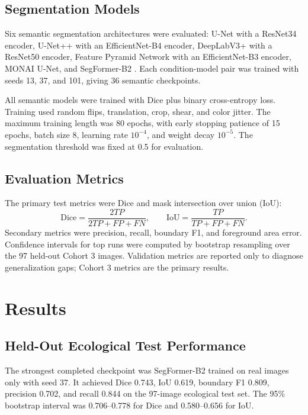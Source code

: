 \documentclass[11pt]{article}
\begin{document}
\subsection{Segmentation Models}

Six semantic segmentation architectures were evaluated: U-Net with a ResNet34 encoder, U-Net++ with an EfficientNet-B4 encoder, DeepLabV3+ with a ResNet50 encoder, Feature Pyramid Network with an EfficientNet-B3 encoder, MONAI U-Net, and SegFormer-B2 \cite{ronneberger2015,zhou2018,chen2018,lin2017,xie2021}. Each condition-model pair was trained with seeds 13, 37, and 101, giving 36 semantic checkpoints.

All semantic models were trained with Dice plus binary cross-entropy loss. Training used random flips, translation, crop, shear, and color jitter. The maximum training length was 80 epochs, with early stopping patience of 15 epochs, batch size 8, learning rate \(10^{-4}\), and weight decay \(10^{-5}\). The segmentation threshold was fixed at 0.5 for evaluation.

\subsection{Evaluation Metrics}

The primary test metrics were Dice and mask intersection over union (IoU):
\begin{equation}
\mathrm{Dice} = \frac{2TP}{2TP + FP + FN}, \qquad
\mathrm{IoU} = \frac{TP}{TP + FP + FN}.
\end{equation}
Secondary metrics were precision, recall, boundary F1, and foreground area error. Confidence intervals for top runs were computed by bootstrap resampling over the 97 held-out Cohort 3 images. Validation metrics are reported only to diagnose generalization gaps; Cohort 3 metrics are the primary results.

\section{Results}

\subsection{Held-Out Ecological Test Performance}

The strongest completed checkpoint was SegFormer-B2 trained on real images only with seed 37. It achieved Dice 0.743, IoU 0.619, boundary F1 0.809, precision 0.702, and recall 0.844 on the 97-image ecological test set. The 95\% bootstrap interval was 0.706--0.778 for Dice and 0.580--0.656 for IoU.
\end{document}
